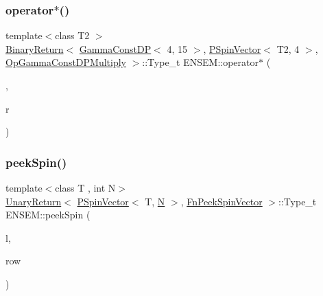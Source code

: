 \subsubsection{\texorpdfstring{operator$\ast$()}{operator*()}\hspace{0.1cm}{\footnotesize\ttfamily [32/32]}}
{\footnotesize\ttfamily template$<$class T2 $>$ \\
\mbox{\hyperlink{structENSEM_1_1BinaryReturn}{Binary\+Return}}$<$ \mbox{\hyperlink{classENSEM_1_1GammaConstDP}{Gamma\+Const\+DP}}$<$ 4, 15 $>$, \mbox{\hyperlink{classENSEM_1_1PSpinVector}{P\+Spin\+Vector}}$<$ T2, 4 $>$, \mbox{\hyperlink{structENSEM_1_1OpGammaConstDPMultiply}{Op\+Gamma\+Const\+D\+P\+Multiply}} $>$\+::Type\+\_\+t E\+N\+S\+E\+M\+::operator$\ast$ (\begin{DoxyParamCaption}\item[{const \mbox{\hyperlink{classENSEM_1_1GammaConstDP}{Gamma\+Const\+DP}}$<$ 4, 15 $>$ \&}]{,  }\item[{const \mbox{\hyperlink{classENSEM_1_1PSpinVector}{P\+Spin\+Vector}}$<$ T2, 4 $>$ \&}]{r }\end{DoxyParamCaption})\hspace{0.3cm}{\ttfamily [inline]}}

\mbox{\label{group__primspinvector_gad13d4acbc90e4d69a8528585ad1c35c8}} 
\subsubsection{\texorpdfstring{peekSpin()}{peekSpin()}}
{\footnotesize\ttfamily template$<$class T , int N$>$ \\
\mbox{\hyperlink{structENSEM_1_1UnaryReturn}{Unary\+Return}}$<$ \mbox{\hyperlink{classENSEM_1_1PSpinVector}{P\+Spin\+Vector}}$<$ T, \mbox{\hyperlink{operator__name__util_8cc_a7722c8ecbb62d99aee7ce68b1752f337}{N}} $>$, \mbox{\hyperlink{structENSEM_1_1FnPeekSpinVector}{Fn\+Peek\+Spin\+Vector}} $>$\+::Type\+\_\+t E\+N\+S\+E\+M\+::peek\+Spin (\begin{DoxyParamCaption}\item[{const \mbox{\hyperlink{classENSEM_1_1PSpinVector}{P\+Spin\+Vector}}$<$ T, \mbox{\hyperlink{operator__name__util_8cc_a7722c8ecbb62d99aee7ce68b1752f337}{N}} $>$ \&}]{l,  }\item[{int}]{row }\end{DoxyParamCaption})\hspace{0.3cm}{\ttfamily [inline]}}

